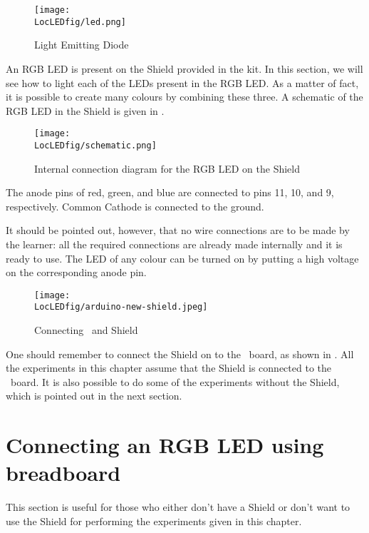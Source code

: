 \begin{figure}
  \centering
  \texttt{[image: \\LocLEDfig/led.png]}
  \caption{Light Emitting Diode}
  \label{fig:ledsym}
\end{figure}

An RGB LED is present on the Shield provided in the kit.  In this
section, we will see how to light each of the LEDs present in the RGB
LED.  As a matter of fact, it is possible to create many colours by
combining these three.  A schematic of the RGB LED in the Shield is
given in .
\begin{figure}
  \centering
  \texttt{[image: \\LocLEDfig/schematic.png]}
  \caption{Internal connection diagram for the RGB LED on the Shield}
  \label{fig:ledblock}
\end{figure}
The anode pins of red, green, and blue are connected to pins 11, 10, and 9, 
respectively. Common Cathode is connected to the ground.

It should be pointed out, however, that no wire connections are to be
made by the learner: all the required connections are already made internally 
and it is ready to use.  The LED of any colour can be turned on by
putting a high voltage on the corresponding anode pin.

\begin{figure}
  \centering
  \texttt{[image: \\LocLEDfig/arduino-new-shield.jpeg]}
  \caption{Connecting \arduino\ and Shield}
  \label{fig:uno-shield-connect}
\end{figure}

One should remember to connect the Shield on to the \arduino\ board, as
shown in . All the experiments in this
chapter assume that the Shield is connected to the \arduino\ board.
It is also possible to do some of the experiments without the Shield,
which is pointed out in the next section. 

\section{Connecting an RGB LED using breadboard}
\label{sec:led-bread}
This section is useful for those who either don't have a Shield or don't want to use the Shield
for performing the experiments given in this chapter.

